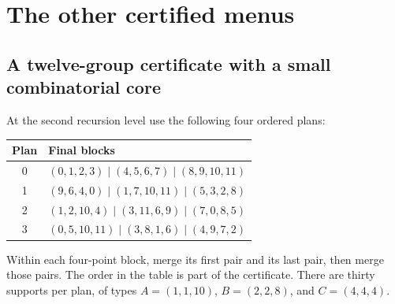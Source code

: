 \section{The other certified menus}
\label{sec:other-menus}

\subsection{A twelve-group certificate with a small combinatorial core}
At the second recursion level use the following four ordered plans:
\begin{center}\small
\begin{tabular}{cl}
\toprule Plan & Final blocks\\\midrule
0 &$(0,1,2,3)\mid(4,5,6,7)\mid(8,9,10,11)$\\
1 &$(9,6,4,0)\mid(1,7,10,11)\mid(5,3,2,8)$\\
2 &$(1,2,10,4)\mid(3,11,6,9)\mid(7,0,8,5)$\\
3 &$(0,5,10,11)\mid(3,8,1,6)\mid(4,9,7,2)$\\
\bottomrule
\end{tabular}
\end{center}
Within each four-point block, merge its first pair and its last pair, then
merge those pairs. The order in the table is part of the certificate.
There are thirty supports per plan, of types $A=(1,1,10)$,
$B=(2,2,8)$, and $C=(4,4,4)$.

